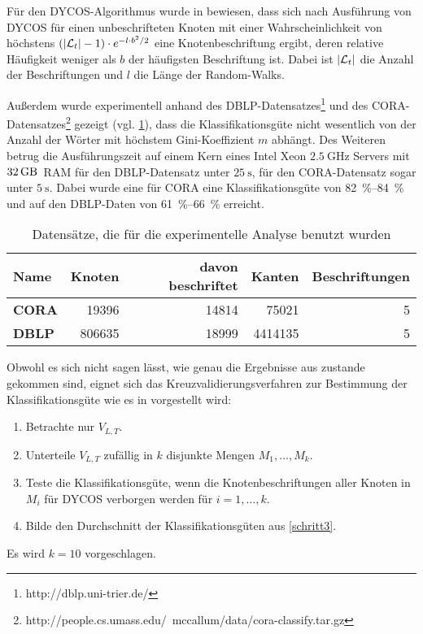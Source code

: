 Für den DYCOS-Algorithmus wurde in \cite{aggarwal2011} bewiesen, dass sich nach
Ausführung von DYCOS für einen unbeschrifteten Knoten mit einer
Wahrscheinlichkeit von höchstens $(|\mathcal{L}_t|-1)\cdot e^{-l \cdot b^2 / 2}$ eine
Knotenbeschriftung ergibt, deren relative Häufigkeit weniger als $b$ der
häufigsten Beschriftung ist. Dabei ist $|\mathcal{L}_t|$ die Anzahl der Beschriftungen
und $l$ die Länge der Random-Walks.

Außerdem wurde experimentell anhand des DBLP-Datensatzes\footnote{http://dblp.uni-trier.de/}
und des CORA-Datensatzes\footnote{http://people.cs.umass.edu/~mccallum/data/cora-classify.tar.gz}
gezeigt (vgl. \cref{tab:datasets}), dass die Klassifikationsgüte nicht wesentlich von der Anzahl der Wörter mit
höchstem Gini-Koeffizient $m$ abhängt. Des Weiteren betrug die Ausführungszeit
auf einem Kern eines Intel Xeon $\SI{2.5}{\GHz}$ Servers mit
$\SI{32}{\giga\byte}$~RAM für den DBLP-Datensatz unter $\SI{25}{\second}$,
für den CORA-Datensatz sogar unter $\SI{5}{\second}$. Dabei wurde eine
für CORA eine Klassifikationsgüte von \SIrange{82}{84}{\percent} und
auf den DBLP-Daten von \SIrange{61}{66}{\percent} erreicht.

\begin{table}[htp]
    \centering
    \begin{tabular}{|l||r|r|r|r|}\hline
    \textbf{Name} & \textbf{Knoten} & \textbf{davon beschriftet} & \textbf{Kanten}  & \textbf{Beschriftungen} \\ \hline\hline
    \textbf{CORA} & \num{19396}  & \num{14814}             & \num{75021}   & 5              \\
    \textbf{DBLP} & \num{806635} & \num{18999 }            & \num{4414135} & 5              \\\hline
    \end{tabular}
    \caption{Datensätze, die für die experimentelle Analyse benutzt wurden}
    \label{tab:datasets}
\end{table}

Obwohl es sich nicht sagen lässt, wie genau die Ergebnisse aus
\cite{aggarwal2011} zustande gekommen sind, eignet sich das
Kreuzvalidierungsverfahren zur Bestimmung der Klassifikationsgüte wie es in
\cite{Lavesson,Stone1974} vorgestellt wird:
\begin{enumerate}
    \item Betrachte nur $V_{L,T}$.
    \item Unterteile $V_{L,T}$ zufällig in $k$ disjunkte Mengen $M_1, \dots, M_k$.
    \item \label{schritt3} Teste die Klassifikationsgüte, wenn die Knotenbeschriftungen
          aller Knoten in $M_i$ für DYCOS verborgen werden für $i=1,\dots, k$.
    \item Bilde den Durchschnitt der Klassifikationsgüten aus \cref{schritt3}.
\end{enumerate}

Es wird $k=10$ vorgeschlagen.
